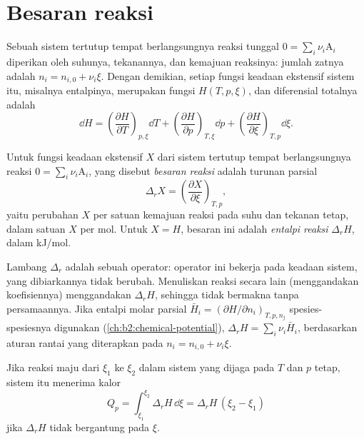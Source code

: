\section{Besaran reaksi}

Sebuah sistem tertutup tempat berlangsungnya reaksi tunggal
$0 = \sum_i\nu_i\mathrm A_i$ diperikan oleh suhunya, tekanannya, dan
kemajuan reaksinya: jumlah zatnya adalah $n_i = n_{i,0} + \nu_i\xi$.
Dengan demikian, setiap fungsi keadaan ekstensif sistem itu, misalnya
entalpinya, merupakan fungsi $H(T, p,
\xi)$, dan diferensial totalnya
adalah
\[
  \dd H = \left(\frac{\partial H}{\partial T}\right)_{p,\xi}\dd T
        + \left(\frac{\partial H}{\partial p}\right)_{T,\xi}\dd p
        + \left(\frac{\partial H}{\partial \xi}\right)_{T,p}\dd\xi .
\]

\begin{definition}\label{def:b2:reaction-enthalpy:reaction-quantity}
Untuk fungsi keadaan ekstensif $X$ dari sistem tertutup tempat
berlangsungnya reaksi $0 = \sum_i\nu_i\mathrm A_i$, yang disebut
\emph{besaran reaksi} adalah turunan parsial
\[
  \Delta_r X = \left(\frac{\partial X}{\partial \xi}\right)_{T,p} ,
\]
yaitu perubahan $X$ per satuan kemajuan reaksi pada suhu dan tekanan
tetap, dalam satuan $X$ per mol. Untuk $X = H$, besaran ini adalah
\emph{entalpi reaksi} $\Delta_r H$, dalam \unit{kJ/mol}.
\end{definition}

\begin{remark}\label{rem:b2:reaction-enthalpy:operator}
Lambang $\Delta_r$ adalah sebuah operator: operator ini bekerja pada
keadaan sistem, yang dibiarkannya tidak berubah. Menuliskan reaksi secara
lain (menggandakan koefisiennya) menggandakan $\Delta_r H$, sehingga
 tidak bermakna tanpa persamaannya. Jika entalpi molar
parsial $\bar H_i = (\partial H/\partial n_i)_{T,p,n_j}$ spesies-spesiesnya
digunakan (\cref{ch:b2:chemical-potential}), $\Delta_r H = \sum_i\nu_i\bar H_i$,
berdasarkan aturan rantai yang diterapkan pada $n_i = n_{i,0} + \nu_i\xi$.
\end{remark}

\begin{proposition}\label{prop:b2:reaction-enthalpy:qp}
Jika reaksi maju dari $\xi_1$ ke $\xi_2$ dalam sistem yang dijaga pada
$T$ dan $p$ tetap, sistem itu menerima kalor
\[
  Q_p = \int_{\xi_1}^{\xi_2}\Delta_r H\,\dd\xi = \Delta_r H\,(\xi_2 - \xi_1)
\]
jika $\Delta_r H$ tidak bergantung pada $\xi$.
\end{proposition}

